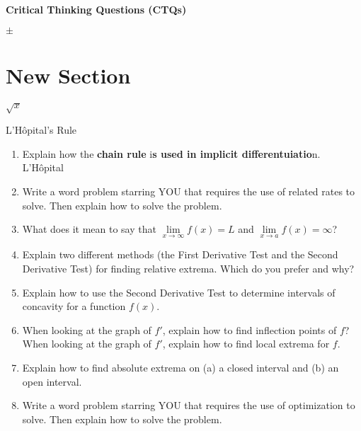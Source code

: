 \documentclass[12pt]{article}
\begin{document}
\textbf{Critical Thinking Questions (CTQs)}

$\pm$

\section{New Section}
$ \sqrt{x} $

L'H\^{o}pital's Rule

\begin{enumerate}
\setlength\itemsep{1em}
\item Explain how the \textbf{chain rule} i\textbf{s used in implicit differentuiatio}n.  L'H\^{o}pital
\item Write a word problem starring YOU that requires the use of related rates to solve. Then explain how to solve the problem. 
\item What does it mean to say that $\lim\limits_{x \to \infty}f(x)=L$ and $\lim\limits_{x \to a}f(x)=\infty$?
\item Explain two different methods (the First Derivative Test and the Second Derivative Test) for finding relative extrema. Which do you prefer and why?
\item Explain how to use the Second Derivative Test to determine intervals of concavity for a function $f(x)$.
\item When looking at the graph of $f'$, explain how to find inflection points of $f$? When looking at the graph of $f'$, explain how to find local extrema for $f$.
\item Explain how to find absolute extrema on (a) a closed interval and (b) an open interval.
\item Write a word problem starring YOU that requires the use of optimization to solve. Then explain how to solve the problem.
\end{enumerate}
\end{document}
